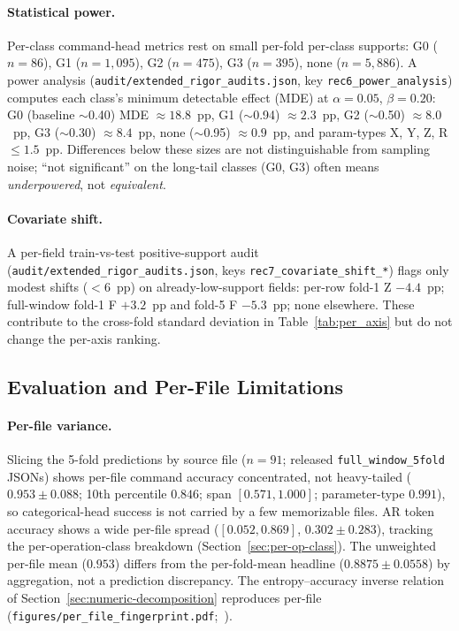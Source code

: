 \documentclass[sensors,article,submit,moreauthors,pdftex]{Definitions/mdpi}
\begin{document}
\paragraph{Statistical power.}\label{sec:lim-power} Per-class command-head metrics rest on small per-fold per-class supports: G0 ($n\!=\!86$), G1 ($n\!=\!1{,}095$), G2 ($n\!=\!475$), G3 ($n\!=\!395$), none ($n\!=\!5{,}886$). A power analysis (\texttt{audit/extended\_rigor\_audits.json}, key \texttt{rec6\_power\_analysis}) computes each class's minimum detectable effect (MDE) at $\alpha\!=\!0.05$, $\beta\!=\!0.20$: G0 (baseline $\sim$0.40) MDE $\approx 18.8$~pp, G1 ($\sim$0.94) $\approx 2.3$~pp, G2 ($\sim$0.50) $\approx 8.0$~pp, G3 ($\sim$0.30) $\approx 8.4$~pp, none ($\sim$0.95) $\approx 0.9$~pp, and param-types X, Y, Z, R $\le 1.5$~pp. Differences below these sizes are not distinguishable from sampling noise; ``not significant'' on the long-tail classes (G0, G3) often means \emph{underpowered}, not \emph{equivalent}.

\paragraph{Covariate shift.}\label{sec:lim-covariate} A per-field train-vs-test positive-support audit (\texttt{audit/extended\_rigor\_audits.json}, keys \texttt{rec7\_covariate\_shift\_*}) flags only modest shifts ($<\!6$~pp) on already-low-support fields: per-row fold-1 Z $-4.4$~pp; full-window fold-1 F $+3.2$~pp and fold-5 F $-5.3$~pp; none elsewhere. These contribute to the cross-fold standard deviation in Table~\ref{tab:per_axis} but do not change the per-axis ranking.

\subsection{Evaluation and Per-File Limitations}
\label{sec:lim-eval}

\paragraph{Per-file variance.}\label{sec:lim-per-file} Slicing the 5-fold predictions by source file ($n=91$; released \texttt{full\_window\_5fold} JSONs) shows per-file command accuracy concentrated, not heavy-tailed ($0.953 \pm 0.088$; 10th percentile $0.846$; span $[0.571, 1.000]$; parameter-type $0.991$), so categorical-head success is not carried by a few memorizable files. AR token accuracy shows a wide per-file spread ($[0.052, 0.869]$, $0.302 \pm 0.283$), tracking the per-operation-class breakdown (Section~\ref{sec:per-op-class}). The unweighted per-file mean ($0.953$) differs from the per-fold-mean headline ($0.8875 \pm 0.0558$) by aggregation, not a prediction discrepancy. The entropy--accuracy inverse relation of Section~\ref{sec:numeric-decomposition} reproduces per-file (\texttt{figures/per\_file\_fingerprint.pdf};~\cite{paperB_entropy}).
\end{document}

